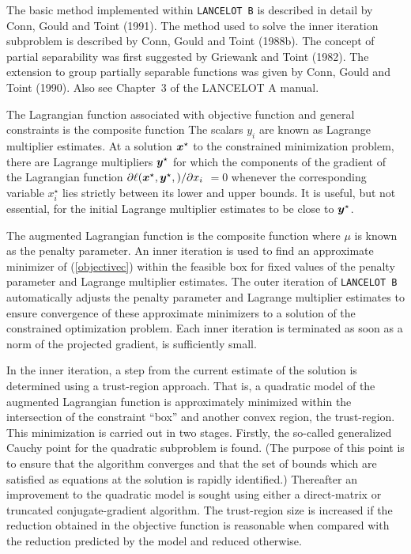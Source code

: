 \documentclass{galahad}
\newcommand{\packagename}{LANCELOT B}
\begin{document}

\galmethod
The basic method implemented within {\tt \packagename} is described in
detail by Conn, Gould and Toint (1991).  The method used to solve the
inner iteration subproblem is described by Conn, Gould and Toint
(1988b). The concept of partial separability was first suggested by
Griewank and Toint (1982).  The extension to group partially separable
functions was given by Conn, Gould and Toint (1990).  Also see Chapter~3
of the {\sf LANCELOT A} manual.

The Lagrangian function associated with objective function
 and general constraints  is the
composite function   The scalars $y_i$ are known as Lagrange
multiplier estimates.  At a solution ${\bm{x}}^{\star}$ to the constrained
minimization problem, there are Lagrange multipliers ${\bm{y}}^{\star}$ for
which the components of the gradient of the Lagrangian function
$\partial \ell({\bm{x}}^{\star}, {\bm{y}}^{\star},) / \partial x_i$ $= 0$ whenever
the corresponding variable $x_i^{\star}$ lies strictly between its lower
and upper bounds.  It is useful, but not essential, for the initial
Lagrange multiplier estimates to be close to ${\bm{y}}^{\star}$.

The augmented Lagrangian function is the composite function
where $\mu$ is known as the penalty parameter.  An inner iteration is
used to find an approximate minimizer of (\ref{objectivec}) within the
feasible box for fixed values of the penalty parameter and Lagrange
multiplier estimates. The outer iteration of {\tt \packagename}
automatically adjusts the penalty parameter and Lagrange multiplier
estimates to ensure convergence of these approximate minimizers to a
solution of the constrained optimization problem. Each inner iteration
is terminated as soon as a norm of the projected gradient,
is sufficiently small.

In the inner iteration, a step from the current estimate of the solution
is determined using a trust-region approach.  That is, a quadratic model
of the augmented Lagrangian function is approximately minimized within
the intersection of the constraint ``box'' and another convex region,
the trust-region.  This minimization is carried out in two stages.
Firstly, the so-called generalized Cauchy point for the quadratic
subproblem is found.  (The purpose of this point is to ensure that the
algorithm converges and that the set of bounds which are satisfied as
equations at the solution is rapidly identified.)  Thereafter an
improvement to the quadratic model is sought using either a
direct-matrix or truncated conjugate-gradient algorithm. The
trust-region size is increased if the reduction obtained in the
objective function is reasonable when compared with the reduction
predicted by the model and reduced otherwise.
\end{document}

